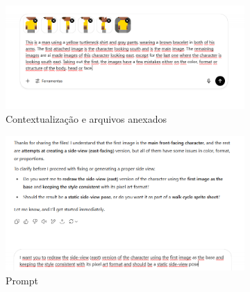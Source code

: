\begin{figure}[htbp]
    \centering
    \caption{\small Processo da utilização 3 do chatGPT em julho/2025}
    \label{fig:chatGPT3}

    \begin{subfigure}{0.75\linewidth}
        \includegraphics[width=1\linewidth]{figs/chatGPT/visao_lateral/tela3.PNG}
        \caption{\small Contextualização e arquivos anexados}
        \label{fig:chatGPT3a}
    \end{subfigure}
    \begin{subfigure}{0.75\linewidth}
        \includegraphics[width=1\linewidth]{figs/chatGPT/visao_lateral/tela4.PNG}
        \caption{\small Prompt}
        \label{fig:chatGPT3b}
    \end{subfigure}
        \begin{subfigure}{0.2\linewidth}

\end{subfigure}
\end{figure}
